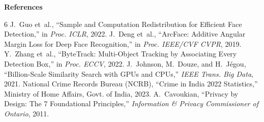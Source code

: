 \documentclass[10pt, a4paper]{article}
\begin{document}
\vspace{4pt}
\begingroup
\renewcommand{\section}[2]{}%
\textbf{\normalsize References}\vspace{2pt}
\begin{thebibliography}{6}
\setlength{\itemsep}{1.5pt}
\footnotesize
{} J.~Guo et~al., ``Sample and Computation Redistribution for Efficient Face Detection,'' in \textit{Proc. ICLR}, 2022.
 J.~Deng et~al., ``ArcFace: Additive Angular Margin Loss for Deep Face Recognition,'' in \textit{Proc. IEEE/CVF CVPR}, 2019.
 Y.~Zhang et~al., ``ByteTrack: Multi-Object Tracking by Associating Every Detection Box,'' in \textit{Proc. ECCV}, 2022.
 J.~Johnson, M.~Douze, and H.~J{\'e}gou, ``Billion-Scale Similarity Search with GPUs and CPUs,'' \textit{IEEE Trans. Big Data}, 2021.
 National Crime Records Bureau (NCRB), ``Crime in India 2022 Statistics,'' Ministry of Home Affairs, Govt. of India, 2023.
 A.~Cavoukian, ``Privacy by Design: The 7 Foundational Principles,'' \textit{Information \& Privacy Commissioner of Ontario}, 2011.
\end{thebibliography}
\endgroup
\end{document}
